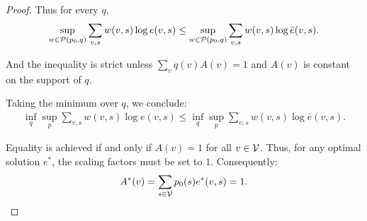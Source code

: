 \begin{proof}
Thus for every $q$,
\begin{align*}
    \sup_{w \in \mathcal{P}(p_0,q)} \sum_{v,s} w(v,s)\log e(v,s)
     \le 
    \sup_{w \in \mathcal{P}(p_0,q)} \sum_{v,s} w(v,s)\log \bar e(v,s).
\end{align*}

And the inequality is strict unless $\sum_v q(v)A(v) = 1$ and $A(v)$ is constant on the support of $q$.

Taking the {minimum over $q$}, we conclude:
\begin{align*}
    \inf_q  \sup_p \sum_{v,s} w(v,s)\log e(v,s)
     \le 
    \inf_q  \sup_p \sum_{v,s} w(v,s)\log \bar e(v,s).
\end{align*}

Equality is achieved if and only if $A(v) = 1$ for all $v \in \mathcal{V}$.
Thus, for any optimal solution $e^*$, the scaling factors must be set to $1$. Consequently:
$$A^*(v) = \sum_{s \in \mathcal{V}} p_0(s) e^*(v,s) = 1.$$
\end{proof}
